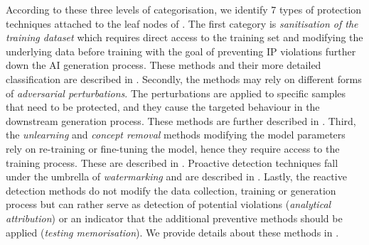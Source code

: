 \documentclass[conference]{IEEEtran}
\begin{document}
According to these three levels of categorisation, we identify 7 types of protection techniques attached to the leaf nodes of .
The first category is \textit{sanitisation of the training dataset} which requires direct access to the training set and modifying the underlying data before training with the goal of preventing IP violations further down the AI generation process. 
These methods and their more detailed classification are described in . 
Secondly, the methods may rely on different forms of \textit{adversarial perturbations}. 
The perturbations are applied to specific samples that need to be protected, and they cause the targeted behaviour in the downstream generation process. These methods are further described in .
Third, the \textit{unlearning} and \textit{concept removal} methods modifying the model parameters rely on re-training or fine-tuning the model, hence they require access to the training process. These are described in .
Proactive detection techniques fall under the umbrella of \textit{watermarking} and are described in .
Lastly, the reactive detection methods do not modify the data collection, training or generation process but can rather serve as detection of potential violations (\textit{analytical attribution}) or an indicator that the additional preventive methods should be applied (\textit{testing memorisation}). We provide details about these methods in .


\end{document}
